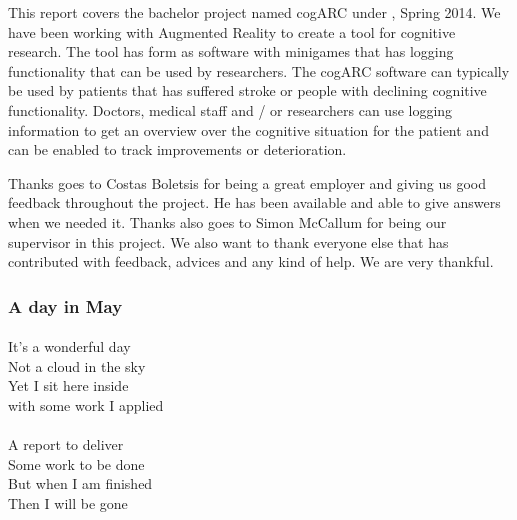This report covers the bachelor project named cogARC under \GUC{}, Spring 2014. We have been working with \gls{Augmented
Reality} to create a tool for cognitive research. The tool has form as software 
with minigames that has logging functionality that can be used by researchers. 
The cogARC software can typically be used by patients that has suffered stroke
or people with declining cognitive functionality. Doctors, medical staff and / or
researchers can use logging information to get an overview over the cognitive
situation for the patient and can be enabled to track improvements or
deterioration.


Thanks goes to Costas Boletsis for being a great employer and giving us good feedback
throughout the project. He has been available and able to give answers when we
needed it. Thanks also goes to Simon McCallum for being our supervisor in this project.
We also want to thank everyone else that has contributed with feedback, advices and
any kind of help. We are very thankful.

\vfill{}

\begin{center}
	
	\subsubsection{A day in May}
	\paragraph{}

	It's a wonderful day\\
	Not a cloud in the sky\\
	Yet I sit here inside\\
	with some work I applied\\

	\paragraph{}

	A report to deliver\\
	Some work to be done\\
	But when I am finished\\
	Then I will be gone\\

\end{center}

\vfill{}